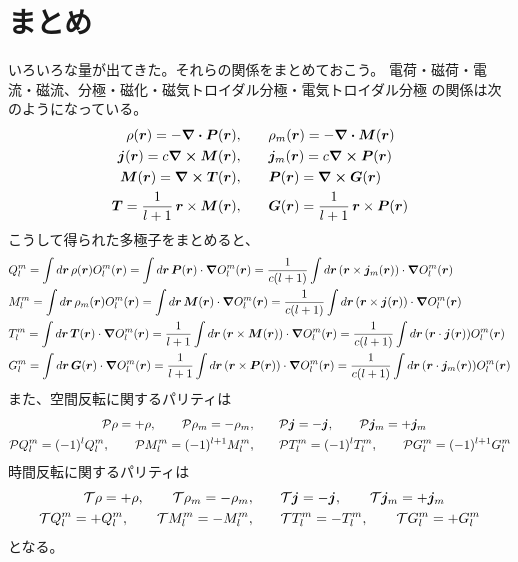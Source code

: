\documentclass[../../master.tex]{subfiles}
\begin{document}
\section{まとめ}
いろいろな量が出てきた。それらの関係をまとめておこう。
電荷・磁荷・電流・磁流、分極・磁化・磁気トロイダル分極・電気トロイダル分極
の関係は次のようになっている。
\begin{align}
    \rho(\vb*{r}) = -\div \vb*{P}(\vb*{r}), \quad & \quad \rho_m(\vb*{r}) = -\div \vb*{M}(\vb*{r})\\
    \vb*{j}(\vb*{r}) = c\curl \vb*{M}(\vb*{r}), \quad & \quad \vb*{j}_m(\vb*{r}) = c \curl \vb*{P}(\vb*{r})\\
    \vb*{M}(\vb*{r}) = \curl \vb*{T}(\vb*{r}), \quad & \quad \vb*{P}(\vb*{r}) = \curl \vb*{G}(\vb*{r})\\
    \vb*{T} = \frac{1}{l+1}\, \vb*{r}\times\vb*{M}(\vb*{r}), \quad & \quad \vb*{G}(\vb*{r}) = \frac{1}{l+1}\, \vb*{r}\times\vb*{P}(\vb*{r})
\end{align}
こうして得られた多極子をまとめると、
\begin{align}
    &Q_l^m
    = \int d\vb*{r}\, \rho(\vb*{r})O_l^m(\vb*{r})
    = \int d\vb*{r}\, \vb*{P}(\vb*{r}) \cdot \grad O_l^m(\vb*{r})
    = \frac{1}{c(l+1)}\int d\vb*{r}\, (\vb*{r}\times \vb*{j}_m(\vb*{r})) \cdot \grad O_l^m(\vb*{r})\\
    &M_l^m
    = \int d\vb*{r}\, \rho_m(\vb*{r})O_l^m(\vb*{r})
    = \int d\vb*{r}\, \vb*{M}(\vb*{r}) \cdot \grad O_l^m(\vb*{r})
    = \frac{1}{c(l+1)}\int d\vb*{r}\, (\vb*{r}\times \vb*{j}(\vb*{r})) \cdot \grad O_l^m(\vb*{r})\\
    &T_l^m
    = \int d\vb*{r}\, \vb*{T}(\vb*{r})\cdot \grad O_l^m(\vb*{r})
    = \frac{1}{l+1}\int d\vb*{r}\, (\vb*{r} \times \vb*{M}(\vb*{r}))\cdot \grad O_l^m(\vb*{r})
    = \frac{1}{c(l+1)}\int d\vb*{r}\, (\vb*{r}\cdot \vb*{j}(\vb*{r})) O_l^m(\vb*{r})\\
    &G_l^m
    = \int d\vb*{r}\, \vb*{G}(\vb*{r})\cdot \grad O_l^m(\vb*{r})
    = \frac{1}{l+1}\int d\vb*{r}\, (\vb*{r} \times \vb*{P}(\vb*{r}))\cdot \grad O_l^m(\vb*{r})
    = \frac{1}{c(l+1)}\int d\vb*{r}\, (\vb*{r}\cdot \vb*{j}_m(\vb*{r})) O_l^m(\vb*{r})
\end{align}
また、空間反転に関するパリティは
\begin{align}
    \mathcal{P} \rho = + \rho, \qquad
    \mathcal{P} \rho_m = - \rho_m, \qquad&
    \mathcal{P} \vb*{j} = - \vb*{j}, \qquad
    \mathcal{P} \vb*{j}_m = + \vb*{j}_m\\
    \mathcal{P}Q_l^m = (-1)^{l}Q_l^m,\qquad
    \mathcal{P}M_l^m = (-1)^{l+1}M_l^m,\qquad&
    \mathcal{P}T_l^m = (-1)^{l}T_l^m,\qquad
    \mathcal{P}G_l^m = (-1)^{l+1}G_l^m
\end{align}
時間反転に関するパリティは
\begin{align}
    \mathcal{T} \rho = + \rho, \qquad
    \mathcal{T} \rho_m = - \rho_m, \qquad&
    \mathcal{T} \vb*{j} = - \vb*{j}, \qquad
    \mathcal{T} \vb*{j}_m = + \vb*{j}_m\\
    \mathcal{T}Q_l^m = +Q_l^m,\qquad
    \mathcal{T}M_l^m = -M_l^m,\qquad&
    \mathcal{T}T_l^m = -T_l^m,\qquad
    \mathcal{T}G_l^m = +G_l^m
\end{align}
となる。
\end{document}
